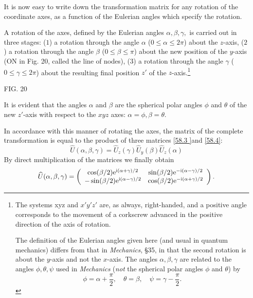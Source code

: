 It is now easy to write down the transformation matrix for any rotation of the coordinate axes, as a function of the Eulerian angles which specify the rotation.

A rotation of the axes, defined by the Eulerian angles $ \alpha,\beta,\gamma, $ is carried out in three stages: ($ 1 $) a rotation through the angle $\alpha$ ($ 0 \leqslant\alpha\leqslant2\pi $) about the $ z $-axis, ($ 2 $) a rotation through the angle $ \beta $ ($ 0\leqslant\beta\leqslant\pi $) about the new position of the $ y $-axis (ON in Fig. 20, called the line of nodes), ($ 3 $) a rotation through the angle $\gamma$ ($ 0\leqslant\gamma\leqslant2\pi $) about the resulting final position $ z' $ of the $ z $-axis.\footnote{The systems xyz and $ x'y'z' $ are, as always, right-handed, and a positive angle corresponds to the movement of a corkscrew advanced in the positive direction of the axis of rotation.
	
The definition of the Eulerian angles given here (and usual in quantum mechanics) differs from that in \textit{Mechanics}, \S35, in that the second rotation is about the $ y $-axis and not the $ x $-axis. The angles $ \alpha,\beta,\gamma $ are related to the angles $ \phi,\theta,\psi $ used in \textit{Mechanics} (\textit{not} the spherical polar angles $\phi$ and $\theta$) by 
\[ \phi=\alpha+\frac{\pi}{2},\quad\theta=\beta,\quad\psi=\gamma-\frac{\pi}{2}. \]
}




FIG. 20



It is evident that the angles $\alpha$ and $\beta$ are the spherical polar angles $\phi$ and $\theta$ of the new $ z' $-axis with respect to the $ xyz $ axes: $ \alpha = \phi, \beta = \theta $.

In accordance with this manner of rotating the axes, the matrix of the complete transformation is equal to the product of three matrices \eqref{58.3 }and \eqref{58.4}:
\[ \hat{U}(\alpha,\beta,\gamma)=\hat{U}_z(\gamma)\hat{U}_y(\beta)\hat{U}_z(\alpha) \]
By direct multiplication of the matrices we finally obtain
\begin{equation}\label{58.6}
\widehat{U}(\alpha,\beta,\gamma)=\left( \begin{array}{cc}
\cos(\beta/2)\mathrm{e}^{\mathrm{i}(\alpha+\gamma)/2}&\sin(\beta/2)\mathrm{e}^{-\mathrm{i}(\alpha-\gamma)/2}\\
-\sin(\beta/2)\mathrm{e}^{\mathrm{i}(\alpha-\gamma)/2}&\cos(\beta/2)\mathrm{e}^{-\mathrm{i}(\alpha+\gamma)/2}
\end{array}\right).
\end{equation}



